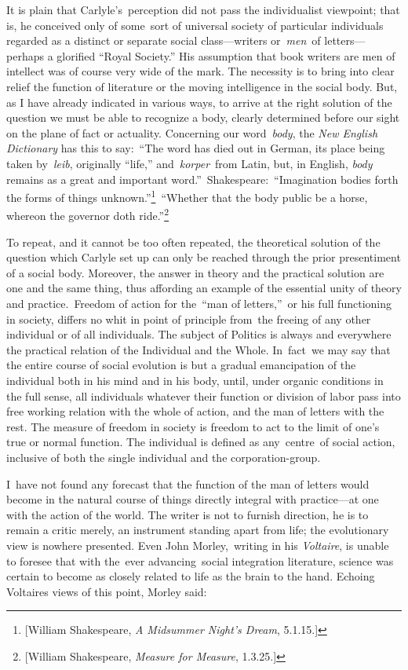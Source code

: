 \documentclass[openany,nobib]{tufte-book}
\begin{document}
\noindent It is plain that Carlyle's~perception did not pass the individualist
viewpoint; that is, he conceived only of some~sort of universal society
of particular individuals regarded as a distinct or separate social
class---writers or~\emph{men}~of letters---perhaps a glorified ``Royal
Society.'' His assumption that book writers are men of intellect was of
course very wide of the mark. The necessity is to bring into clear
relief the function of literature or the moving intelligence in the
social body. But, as I have already indicated in various ways, to arrive
at the right solution of the question we must be able to recognize a
body, clearly determined before our sight on the plane of fact or
actuality. Concerning our word~\emph{body}, the \emph{New English
Dictionary} has this to say:~``The word has died out in German, its
place being taken by~\emph{leib}, originally ``life,''
and~\emph{korper}~from Latin, but, in English, \emph{body} remains as a
great and important word.''~Shakespeare:~``Imagination bodies forth the
forms of things unknown.''\footnote{{[}William Shakespeare, \emph{A
  Midsummer Night's Dream}, 5.1.15.{]}}~``Whether that the body public
be a horse, whereon the governor doth ride.''\footnote{{[}William
  Shakespeare, \emph{Measure for Measure}, 1.3.25.{]}}~

To repeat, and it cannot be too often repeated, the theoretical solution
of the question which Carlyle set up can only be reached through the
prior presentiment of a social body. Moreover, the answer in theory and
the practical solution are one and the same thing, thus affording an
example of the essential unity of theory and practice.~Freedom of action
for the~``man of letters,''~or his full functioning in society, differs
no whit in point of principle from~the freeing of any other individual
or of all individuals. The subject of Politics is always and everywhere
the practical relation of the Individual and the Whole. In~fact~we may
say that the entire course of social evolution is but a gradual
emancipation of the individual both in his mind and in his body, until,
under organic conditions in the full sense, all individuals whatever
their function or division of labor pass into free working relation with
the whole of action, and the man of letters with the rest. The measure
of freedom in society is freedom to act to the limit of one's true or
normal function. The individual is defined as any~centre~of social
action, inclusive of both the single individual and the
corporation-group.~~

I~have not found any forecast that the function of the man of letters
would become in the natural course of things directly integral with
practice---at one with the action of the world. The writer is not to
furnish direction, he is to remain a critic merely, an instrument
standing apart from life; the evolutionary view is nowhere presented.
Even John Morley,~writing in his \emph{Voltaire}, is unable to foresee
that with the~ever advancing~social integration literature, science was
certain to become as closely related to life as the brain to the hand.
Echoing Voltaire\textquotesingle s views of this point, Morley said:~
\end{document}
